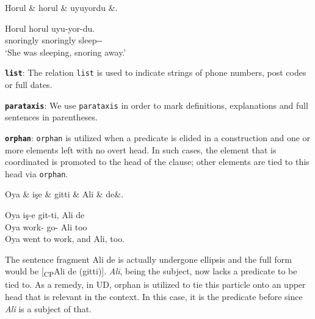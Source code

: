 \documentclass[11pt,a4paper]{article}
\begin{document}
\begin{exe}
\ex \label{compound:redup}
\begin{dependency}
\begin{deptext}[column sep=0.25cm]
Horul \& horul \& uyuyordu \&. \\
\end{deptext}
\end{dependency}
\gll Horul horul uyu-yor-du. \\
snoringly snoringly sleep-\Prog{}-\Pst{} \\
\glt ‘She was sleeping, snoring away.’
\end{exe}

\textbf{\texttt{list}}:
The relation \texttt{list} is used to indicate strings of phone numbers, post codes or full dates.

\textbf{\texttt{parataxis}}:
We use \texttt{parataxis} in order to mark definitions, explanations and full sentences in parentheses.

\textbf{\texttt{orphan}}:
\texttt{orphan} is utilized when a predicate is elided in a construction and one or more elements left with no overt head. In such cases, the element that is coordinated is promoted to the head of the clause; other elements are tied to this head via \texttt{orphan}.

\begin{exe}
\ex \label{advmod:emph}
\begin{dependency}
\begin{deptext}[column sep=0.24cm]
Oya \& işe \& gitti \& Ali \& de\&. \\
\end{deptext}
\end{dependency}
\gll Oya iş-e git-ti, Ali de  \\
Oya work-\Dat{} go-\Pst{} Ali too  \\
\glt Oya went to work, and Ali, too.
\end{exe}

The sentence fragment Ali de is actually undergone ellipsis and the full form would be [\textsubscript{CP}Ali de (gitti)]. \textit{Ali}, being the subject, now lacks a predicate to be tied to. As a remedy, in UD, orphan is utilized to tie this particle onto an upper head that is relevant in the context. In this case, it is the predicate before since \textit{Ali} is a subject of that.
\end{document}
